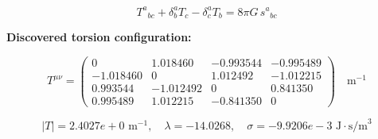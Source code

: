 
\begin{equation}
  T^a{}_{bc} + \delta^a_b T_c - \delta^a_c T_b = 8\pi G \, s^a{}_{bc}
\end{equation}

\textbf{Discovered torsion configuration:}

\begin{equation}
  T^{\mu\nu} = \begin{pmatrix}
    0 & 1.018460 & -0.993544 & -0.995489 \\
    -1.018460 & 0 & 1.012492 & -1.012215 \\
    0.993544 & -1.012492 & 0 & 0.841350 \\
    0.995489 & 1.012215 & -0.841350 & 0
  \end{pmatrix} \quad \text{m}^{-1}
\end{equation}

\begin{equation}
  |T| = 2.4027e+0 \text{ m}^{-1}, \quad
  \lambda = -14.0268, \quad
  \sigma = -9.9206e-3 \text{ J}\cdot\text{s/m}^3
\end{equation}